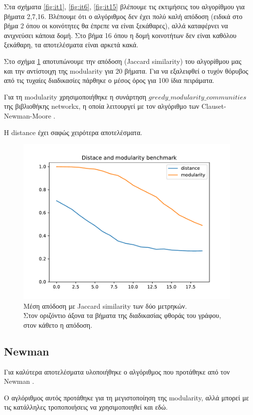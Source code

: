 \documentclass[10pt, letterpaper]{article}
\newcommand{\en}{\selectlanguage{english}}
\newcommand{\gr}{\selectlanguage{greek}}
\begin{document}
Στα σχήματα \ref{fig:it1}, \ref{fig:it6}, \ref{fig:it15} βλέπουμε τις εκτιμήσεις του 
αλγορίθμου για βήματα 2,7,16. Βλέπουμε ότι ο αλγόριθμος δεν έχει πολύ καλή απόδοση 
(ειδικά στο βήμα 2 όπου οι κοινότητες θα έπρεπε να είναι ξεκάθαρες), αλλά καταφέρνει 
να ανιχνεύσει κάποια δομή. Στο βήμα 16 όπου η δομή κοινοτήτων δεν είναι καθόλου ξεκάθαρη, 
τα αποτελέσματα είναι αρκετά κακά.

Στο σχήμα \ref{bench1} αποτυπώνουμε την απόδοση (\textlatin{Jaccard similarity})
του αλγορίθμου μας και την αντίστοιχη της \textlatin{modularity} για 20 βήματα.  
Για να εξαλειφθεί ο τυχόν θόρυβος από τις τυχαίες διαδικασίες πάρθηκε ο μέσος όρος 
για 100 ίδια πειράματα. 

Για τη \textlatin{modularity} χρησιμοποιήθηκε η συνάρτηση $greedy\_modularity\_communities$ της 
βιβλιοθήκης \textlatin{networkx}, η οποία λειτουργεί με τον αλγόριθμο των \en Clauset-Newman-Moore \gr 
\cite{Clauset:fastgreedy}\relax.
 
Η \textlatin{distance} έχει σαφώς χειρότερα αποτελέσματα.


\begin{figure}[H]
  \centering
  \includegraphics[width=0.5\linewidth]{benchmark.pdf}
  \caption{Μέση απόδοση με \textlatin{Jaccard similarity} των δύο μετρηκών. \\
  Στον οριζόντιο άξονα τα βήματα της διαδικασίας φθοράς του γράφου, στον κάθετο η απόδοση.}
  \label{bench1}
\end{figure}


\subsection{\textlatin{Newman}}

Για καλύτερα αποτελέσματα υλοποιήθηκε ο αλγόριθμος που προτάθηκε από τον \textlatin{Newman} 
\cite{Newman}\relax. 

Ο αγλόριθμος αυτός προτάθηκε για τη μεγιστοποίηση της \en modularity, \gr αλλά μπορεί με τις κατάλληλες τροποποιήσεις να χρησιμοποιηθεί και εδώ.
\end{document}
